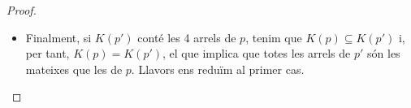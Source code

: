 \documentclass[11pt,a4paper]{article}
\theoremstyle{definition}
\begin{document}
\begin{proof}
\begin{itemize}
\begin{itemize}
\begin{multline*}
\begin{array}{l}
                                \frac{2\beta_1+3\beta_2+3\beta_3}{4}=\gamma_1+\delta_1                   \\
                                \frac{\beta_1\beta_2+\beta_1\beta_3+2\beta_1\beta_3}{4}=\gamma_1\delta_1 \\
                                \frac{\beta_1+\gamma_1+\delta_1}{3}=\beta_2                              \\
                                \frac{\beta_1\gamma_1+\beta_1\delta_1+\gamma_1\delta_1}{3}=\beta_2^2
                            \end{array}\right.
                        \end{multline*} on en l'última doble implicació hem expandit els polinomis i hem igualat coeficient a coeficient per formar les quatre equacions finals. Aquest sistema té solució si i només si $\beta_1=\beta_2=\beta_3=\gamma_1=\delta_1=:z_0$. Per tant, obtenim $p(z)=\alpha_0(z-z_0)^4$. Si $p^{(3)}(z)=\alpha_3(z-\beta_1)$, això implica que $\beta_1\in[\beta_2,\gamma_2]\subseteq[\beta_1,\beta_3]$ i, per tant, que $\beta_1=\beta_2$ i ens reduïm al cas que acabem de comentar.
                  \item Finalment, si $K(p')$ conté les 4 arrels de $p$, tenim que $K(p)\subseteq K(p')$ i, per tant, $K(p)=K(p')$, el que implica que totes les arrels de $p'$ són les mateixes que les de $p$. Llavors ens reduïm al primer cas.
              \end{itemize}
    \end{itemize}
\end{proof}
\printbibliography[heading=bibintoc,title={Referències}]
\end{document}
